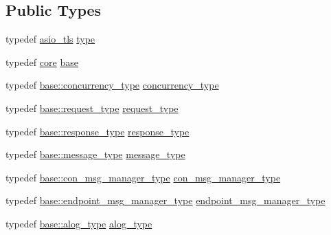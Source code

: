 \subsection*{Public Types}
\begin{DoxyCompactItemize}
\item 
typedef \hyperlink{structwebsocketpp_1_1config_1_1asio__tls}{asio\+\_\+tls} \hyperlink{structwebsocketpp_1_1config_1_1asio__tls_a92b38c443d4d89c2acf4490e696e0810}{type}
\item 
typedef \hyperlink{structwebsocketpp_1_1config_1_1core}{core} \hyperlink{structwebsocketpp_1_1config_1_1asio__tls_ad3e689ff15338d7bb3647e9af27d4f2f}{base}
\item 
typedef \hyperlink{structwebsocketpp_1_1config_1_1core_a894e9dea6f10e890ea21a687607c2f70}{base\+::concurrency\+\_\+type} \hyperlink{structwebsocketpp_1_1config_1_1asio__tls_a94dbb7a141044dbc99de282fdeb560d8}{concurrency\+\_\+type}
\item 
typedef \hyperlink{structwebsocketpp_1_1config_1_1core_a6b17eee7cb81f247afc8f3d7b3a3fc9e}{base\+::request\+\_\+type} \hyperlink{structwebsocketpp_1_1config_1_1asio__tls_a8435d19caaed4858faa88cae4bc46a81}{request\+\_\+type}
\item 
typedef \hyperlink{structwebsocketpp_1_1config_1_1core_a08e9a1d498f9002cbabcb1102df6005b}{base\+::response\+\_\+type} \hyperlink{structwebsocketpp_1_1config_1_1asio__tls_ad6c59e6090c5e66d0a9e15f4f6063631}{response\+\_\+type}
\item 
typedef \hyperlink{structwebsocketpp_1_1config_1_1core_afb4c134e0a311beebe31a50458855279}{base\+::message\+\_\+type} \hyperlink{structwebsocketpp_1_1config_1_1asio__tls_a27450d727458295e6148c3ed7405e24c}{message\+\_\+type}
\item 
typedef \hyperlink{structwebsocketpp_1_1config_1_1core_a9f19abdae7b74d1595b410ea47f3e0d8}{base\+::con\+\_\+msg\+\_\+manager\+\_\+type} \hyperlink{structwebsocketpp_1_1config_1_1asio__tls_add8c7b91ce5f365d76f1d53b37002cc9}{con\+\_\+msg\+\_\+manager\+\_\+type}
\item 
typedef \hyperlink{structwebsocketpp_1_1config_1_1core_ac2a5caeef488e2f177bb8f92a37d2f34}{base\+::endpoint\+\_\+msg\+\_\+manager\+\_\+type} \hyperlink{structwebsocketpp_1_1config_1_1asio__tls_a7fdb90dbe56e52adc2d99e38d4fc626d}{endpoint\+\_\+msg\+\_\+manager\+\_\+type}
\item 
typedef \hyperlink{structwebsocketpp_1_1config_1_1core_a3b2c116aa4077f10b085f008b48028e2}{base\+::alog\+\_\+type} \hyperlink{structwebsocketpp_1_1config_1_1asio__tls_a27fcf6498be1a6ab0e81ea117b5a9903}{alog\+\_\+type}

\end{DoxyCompactItemize}
